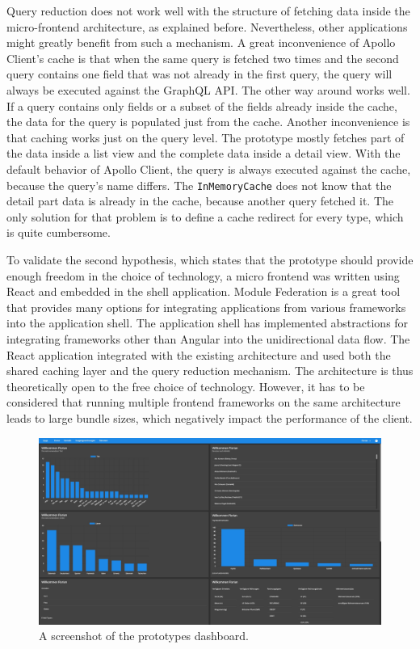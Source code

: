 \bigskip

\noindent Query reduction does not work well with the structure of fetching data inside the micro-frontend architecture, as explained before. Nevertheless, other applications might greatly benefit from such a mechanism. A great inconvenience of Apollo Client's cache is that when the same query is fetched two times and the second query contains one field that was not already in the first query, the query will always be executed against the GraphQL \ac{API}. The other way around works well. If a query contains only fields or a subset of the fields already inside the cache, the data for the query is populated just from the cache. Another inconvenience is that caching works just on the query level. The prototype mostly fetches part of the data inside a list view and the complete data inside a detail view. With the default behavior of Apollo Client, the query is always executed against the cache, because the query's name differs. The \texttt{InMemoryCache} does not know that the detail part data is already in the cache, because another query fetched it. The only solution for that problem is to define a cache redirect for every type, which is quite cumbersome.

\bigskip

\noindent To validate the second hypothesis, which states that the prototype should provide enough freedom in the choice of technology, a micro frontend was written using React and embedded in the shell application. Module Federation is a great tool that provides many options for integrating applications from various frameworks into the application shell. The application shell has implemented abstractions for integrating frameworks other than Angular into the unidirectional data flow. The React application integrated with the existing architecture and used both the shared caching layer and the query reduction mechanism. The architecture is thus theoretically open to the free choice of technology. However, it has to be considered that running multiple frontend frameworks on the same architecture leads to large bundle sizes, which negatively impact the performance of the client.

\ifshowImages
  \begin{figure}[H]
    \centering
    \includegraphics[width=1\linewidth]{images/prototype-screenshots/ui-dashboard.png}
    \caption{A screenshot of the prototypes dashboard.}\label{fig:conclusion:ui-dashboard}
  \end{figure}
\fi